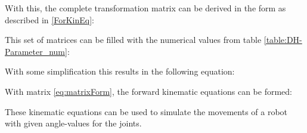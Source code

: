 With this, the complete transformation matrix can be derived in the form as described in \ref{ForKinEq}:



This set of matrices can be filled with the numerical values from table \ref{table:DH-Parameter_num}:



With some simplification this results in the following equation:



With matrix \ref{eq:matrixForm}, the forward kinematic equations can be formed:




These kinematic equations can be used to simulate the movements of a robot with given angle-values for the joints. 



